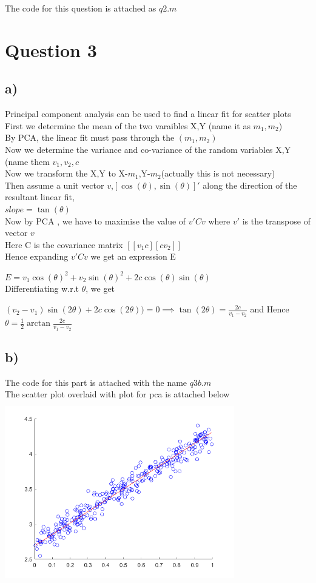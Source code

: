 \documentclass{article}
\begin{document}
The code for this question is attached as $q2.m$

\section*{Question 3}
\subsection*{a)}
Principal component analysis can be used to find a linear fit for scatter plots\\
First we determine the mean of the two varaibles X,Y (name it as $m_1,m_2$)\\
By PCA, the linear fit must pass through the $(m_1,m_2)$\\
Now we determine the variance and co-variance of the random variables X,Y (name them $v_1,v_2, c$\\
Now we transform the X,Y to X-$m_1$,Y-$m_2$(actually this is not necessary)\\
Then assume a unit vector $v$,$[\cos(\theta),\sin(\theta)]'$ along the direction of the resultant linear fit,\\$slope = \tan(\theta)$\\
Now by PCA , we have to maximise the value of $v'Cv$ where $v'$ is the transpose of vector $v$\\
Here C is the covariance matrix $[[v_1 c][c v_2]]$\\
Hence expanding $v'Cv$ we get an expression E\par 
$E = v_1\cos(\theta)^2+v_2\sin(\theta)^2+2c\cos(\theta)\sin(\theta)$\\
Differentiating w.r.t $\theta$, we get \par 
$(v_2-v_1)\sin(2\theta) + 2c \cos(2\theta)) = 0 \implies \tan(2\theta) = \frac{2c}{v_1-v_2}$ and Hence $\boxed{\theta = \frac{1}{2}\arctan{\frac{2c}{v_1-v_2}}}$
\subsection*{b)}
The code for this part is attached with the name $q3b.m$ \\
The scatter plot overlaid with plot for pca is attached below\\
    {\includegraphics[width =10cm, height=8cm]{hw4/q3b.png}}
\end{document}
